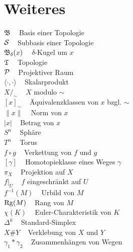 \section*{Weiteres}
$\mathfrak{B}\;\;\;$ Basis einer Topologie\\
$\mathcal{S}\;\;\;$ Subbasis einer Topologie\\
$\mathfrak{B}_\delta(x)\;\;\;$ $\delta$-Kugel um $x$\\
$\mathfrak{T}\;\;\;$ Topologie\\

$\mathcal{P}\;\;\;$ Projektiver Raum\\
$\langle \cdot , \cdot \rangle\;\;\;$ Skalarprodukt\\
$X /_\sim\;\;\;$ $X$ modulo $\sim$\\
$[x]_\sim\;\;\;$ Äquivalenzklassen von $x$ bzgl. $\sim$\\
$\| x \|\;\;\;$ Norm von $x$\\
$| x |\;\;\;$ Betrag von $x$\\

$S^n\;\;\;$ Sphäre\\
$T^n\;\;\;$ Torus\\

$f \circ g\;\;\;$ Verkettung von $f$ und $g$\\
$[\gamma]\;\;\;$ Homotopieklasse eines Weges $\gamma$\\
$\pi_X\;\;\;$ Projektion auf $X$\\
$f|_U\;\;\;$ $f$ eingeschränkt auf $U$\\
$f^{-1}(M)\;\;\;$ Urbild von $M$\\
$\operatorname{Rg}(M)\;\;\;$ Rang von $M$\\
$\chi(K)\;\;\;$ Euler-Charakteristik von $K$\\
$\Delta^k\;\;\;$ Standard-Simplex\\
$X \# Y\;\;\;$ Verklebung von $X$ und $Y$\\
$\gamma_1 * \gamma_2\;\;\;$ Zusammenhängen von Wegen\\
\onecolumn

